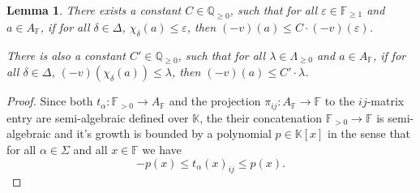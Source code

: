 \documentclass[12pt]{amsart}
\newcommand{\F}{\mathbb{F} }
\newcommand{\Q}{\mathbb{Q} }
\newcommand{\K}{\mathbb{K}}
\numberwithin{equation}{section}
\newtheorem{lemma}[theorem]{Lemma}
\theoremstyle{remark} %
\begin{document}
\begin{lemma}\label{lem:matrixval-bound}
	There exists a constant $C\in \Q_{\geq 0}$, such that for all $\varepsilon \in \F_{\geq 1}$ and $a\in A_\F$, if for all $\delta\in \Delta$, $\chi_\delta(a) \leq \varepsilon $, then $(-v)(a) \leq C \cdot  (-v)(\varepsilon)$. 
	
	There is also a constant $C' \in \Q_{\geq 0}$, such that for all $\lambda \in \Lambda_{\geq 0}$ and $a\in A_\F$, if for all $\delta\in \Delta$, $(-v)(\chi_\delta(a)) \leq \lambda$, then $(-v)(a) \leq C' \cdot \lambda$.
\end{lemma}
\begin{proof}
	Since both $t_\alpha \colon \F_{>0} \to A_\F$ and the projection $\pi_{ij} \colon A_\F \to \F$ to the $ij$-matrix entry are semi-algebraic defined over $\K$, the their concatenation $\F_{>0} \to \F$ is semi-algebraic and it's growth is bounded by a polynomial $p\in \K[x]$ in the sense that for all $\alpha \in \Sigma$ and all $x\in \F$ we have
	$$
	- p(x) \leq t_\alpha(x)_{ij} \leq p(x).
	$$
	

\end{proof}
\end{document}
